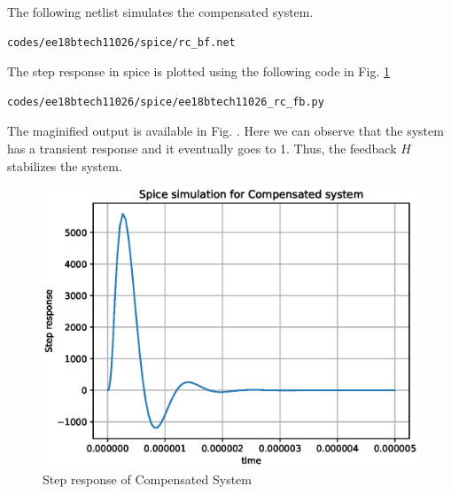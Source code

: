 \begin{enumerate}[label=\arabic*.,ref=\theenumi]
The following netlist simulates the compensated system.
   \begin{lstlisting}
codes/ee18btech11026/spice/rc_bf.net
\end{lstlisting}
 The step response in spice is plotted using the following code in Fig. \ref{fig:ee18btech11026_rc_fb}
 \begin{lstlisting}
codes/ee18btech11026/spice/ee18btech11026_rc_fb.py
\end{lstlisting}
The maginified output is available in Fig.     \label{fig:ee18btech11026_rc_fb_mag}
.  Here we can observe that the system has a transient response and it eventually  goes to 1. Thus, the feedback $H$ stabilizes the system.
\begin{figure}[!h]
    \centering
    \includegraphics[width=\columnwidth]{./figs/ee18btech11026/ee18btech11026_spice_result_rc_bf.eps}
    \caption{Step response of Compensated System}
    \label{fig:ee18btech11026_rc_fb}
\end{figure}



\end{enumerate}
